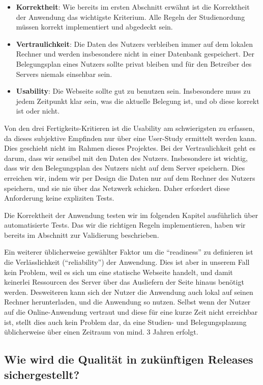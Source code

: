 \documentclass[ngerman]{article}
\begin{document}
\begin{itemize}
    \item \textbf{Korrektheit}:
        Wie bereits im ersten Abschnitt erwähnt ist die Korrektheit der Anwendung das wichtigste Kriterium.
        Alle Regeln der Studienordung müssen korrekt implementiert und abgedeckt sein.
    \item \textbf{Vertraulichkeit}:
        Die Daten des Nutzers verbleiben immer auf dem lokalen Rechner und werden insbesondere nicht in einer Datenbank gespeichert.
        Der Belegungsplan eines Nutzers sollte privat bleiben und für den Betreiber des Servers niemals einsehbar sein.
    \item \textbf{Usability}:
        Die Webseite sollte gut zu benutzen sein.
        Insbesondere muss zu jedem Zeitpunkt klar sein, was die aktuelle Belegung ist, und ob diese korrekt ist oder nicht.
\end{itemize}

Von den drei Fertigkeits-Kritieren ist die Usability am schwierigsten zu erfassen, da dieses subjektive Empfinden nur über eine User-Study ermittelt werden kann.
Dies geschieht nicht im Rahmen dieses Projektes.
Bei der Vertraulichkeit geht es darum, dass wir sensibel mit den Daten des Nutzers.
Insbesondere ist wichtig, dass wir den Belegungsplan des Nutzers nicht auf dem Server speichern.
Dies erreichen wir, indem wir per Design die Daten nur auf dem Rechner des Nutzers speichern, und sie nie über das Netzwerk schicken.
Daher erfordert diese Anforderung keine expliziten Tests.

Die Korrektheit der Anwendung testen wir im folgenden Kapitel ausführlich über automatisierte Tests.
Das wir die richtigen Regeln implementieren, haben wir bereits im Abschnitt zur Validierung beschrieben.

Ein weiterer üblicherweise gewählter Faktor um die ``readiness'' zu definieren ist die Verlässlichkeit (``reliability'') der Anwendung.
Dies ist aber in unserem Fall kein Problem, weil es sich um eine statische Webseite handelt, und damit keinerlei Ressourcen des Server über das Ausliefern der Seite hinaus benötigt werden.
Desweiteren kann sich der Nutzer die Anwendung auch lokal auf seinen Rechner herunterladen, und die Anwendung so nutzen.
Selbst wenn der Nutzer auf die Online-Anwendung vertraut und diese für eine kurze Zeit nicht erreichbar ist, stellt dies auch kein Problem dar, da eine Studien- und Belegungsplanung üblicherweise über einen Zeitraum von mind. 3 Jahren erfolgt.

\subsection{Wie wird die Qualität in zukünftigen Releases sichergestellt?}
\end{document}
